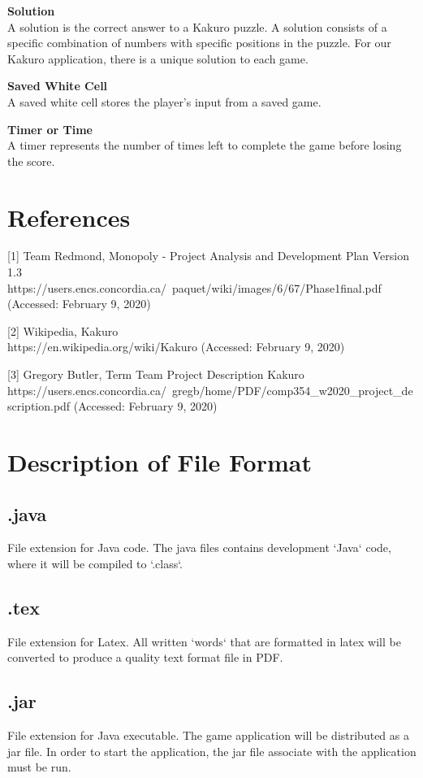 \documentclass[12pt]{article}
\begin{document}
\textbf{Solution}\\
A solution is the correct answer to a Kakuro puzzle. A solution consists of a specific combination of numbers with specific positions in the puzzle. For our Kakuro application, there is a unique solution to each game.
\vspace{5mm}

\textbf{Saved White Cell}\\
A saved white cell stores the player's input from a saved game.
\vspace{5mm}

\textbf{Timer or Time}\\
A timer represents the number of times left to complete the game before losing the score.
\vspace{5mm}

\newpage

\section{References}
\vspace{5mm}
  
[1] Team Redmond, Monopoly - Project Analysis and Development Plan Version 1.3\\
https://users.encs.concordia.ca/~paquet/wiki/images/6/67/Phase1final.pdf (Accessed: February 9, 2020)

[2] Wikipedia, Kakuro\\
https://en.wikipedia.org/wiki/Kakuro (Accessed:  February 9, 2020)

[3] Gregory Butler, Term Team Project Description
Kakuro\\ 
https://users.encs.concordia.ca/~gregb/home/PDF/comp354\_w2020\_project\_description.pdf (Accessed: February 9, 2020)\\

\setlength{\parindent}{10ex}

\newpage

\section{Description of File Format}

\subsection{.java}
File extension for Java code. The java files contains development `Java` code, where it will be compiled to `.class`.
\subsection{.tex}
File extension for Latex. All written `words` that are formatted in latex will be converted to produce a quality text format file in PDF.
\subsection{.jar}
File extension for Java executable. The game application will be distributed as a jar file. In order to start the application, the jar file associate with the application must be run.
\end{document}
